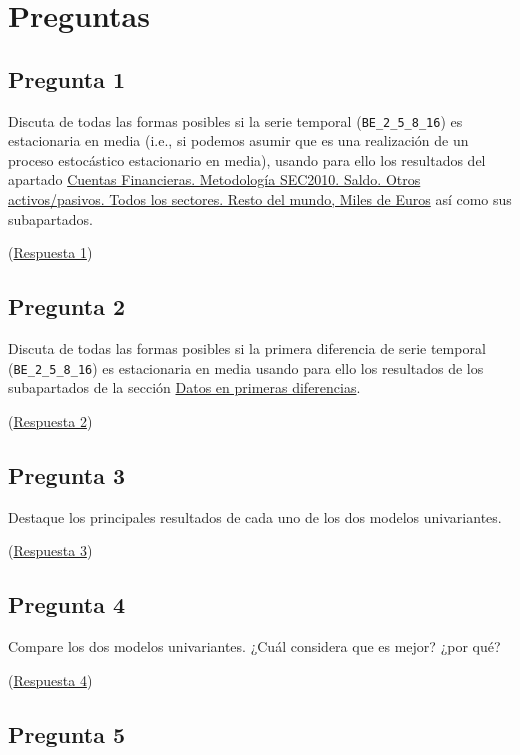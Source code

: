 \documentclass[10pt]{article}
\begin{document}
\section*{Preguntas}
\label{sec:org609b09c}
\subsection*{Pregunta 1}
\label{sec:org493afb9}

Discuta de todas las formas posibles si la serie temporal
(\texttt{BE\_2\_5\_8\_16}) es estacionaria en media (i.e., si podemos asumir que
es una realización de un proceso estocástico estacionario en media),
usando para ello los resultados del apartado \hyperref[sec:org08ae3d4]{Cuentas Financieras. Metodología SEC2010. Saldo. Otros activos/pasivos. Todos los sectores. Resto del mundo, Miles de Euros} así como sus
subapartados.

(\hyperref[sec:org3ff719b]{Respuesta 1})
\subsection*{Pregunta 2}
\label{sec:orgcdf1092}

Discuta de todas las formas posibles si la primera diferencia de serie
temporal (\texttt{BE\_2\_5\_8\_16}) es estacionaria en media usando para ello los
resultados de los subapartados de la sección \hyperref[sec:org13cda42]{Datos en primeras diferencias}.

(\hyperref[sec:org4e26b41]{Respuesta 2})
\subsection*{Pregunta 3}
\label{sec:orga9286f5}

Destaque los principales resultados de cada uno de los dos modelos
univariantes.

(\hyperref[sec:orgbb1303e]{Respuesta 3})
\subsection*{Pregunta 4}
\label{sec:orgcb53583}

Compare los dos modelos univariantes. ¿Cuál considera que es mejor? ¿por qué?

(\hyperref[sec:org8637613]{Respuesta 4})
\subsection*{Pregunta 5}
\label{sec:org1e27c44}
\end{document}
